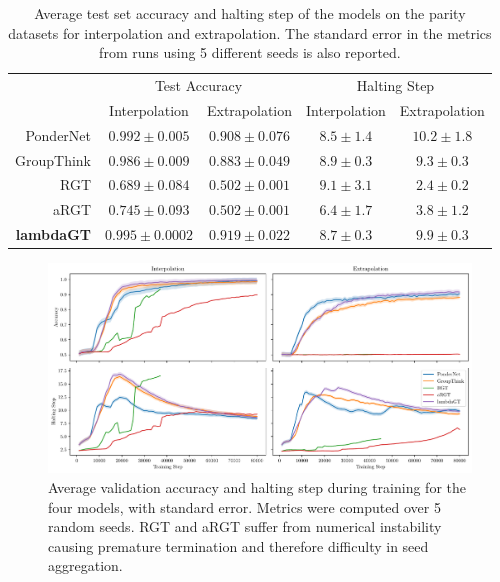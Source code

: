 \documentclass{article}
\begin{document}
\begin{table}[t]
\caption{Average test set accuracy and halting step of the models on the parity datasets for interpolation and extrapolation. The standard error in the metrics from runs using 5 different seeds is also reported.}
\label{tab:test-results}
\centering
\begin{tabular}{rcccc}
\toprule
 & \multicolumn{2}{c}{Test Accuracy} & \multicolumn{2}{c}{Halting Step} \\
 \cmidrule(rl){2-3} \cmidrule(rl){4-5}
 & Interpolation & Extrapolation & Interpolation & Extrapolation \\ \midrule
PonderNet & $0.992 \pm 0.005$ & $0.908 \pm 0.076$ & $8.5 \pm 1.4$ & $10.2 \pm 1.8$ \\
GroupThink & $0.986 \pm 0.009$ & $0.883 \pm 0.049$ & $8.9 \pm 0.3$ & $9.3 \pm 0.3$ \\
RGT & $0.689 \pm 0.084$ & $0.502 \pm 0.001$ & $9.1 \pm 3.1$ & $2.4 \pm 0.2$ \\
aRGT & $0.745 \pm 0.093$ & $0.502 \pm 0.001$ & $6.4 \pm 1.7$ & $3.8 \pm 1.2$ \\
\textbf{lambdaGT} & $\bm{0.995 \pm 0.0002}$ & $\bm{0.919 \pm 0.022}$ & $8.7 \pm 0.3$ & $9.9 \pm 0.3$ \\
\bottomrule
\end{tabular}
\end{table}

\begin{figure}[ht]
\centering
\includegraphics[width=\textwidth]{val_results.pdf}
\caption{Average validation accuracy and halting step during training for the four models, with standard error. Metrics were computed over 5 random seeds. RGT and aRGT suffer from numerical instability causing premature termination and therefore difficulty in seed aggregation.}
\label{fig:timeseries}
\end{figure}
\end{document}
